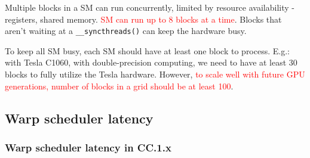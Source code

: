Multiple blocks in a SM can run concurrently, limited by resource
availability - registers, shared memory.
\textcolor{red}{SM can run up to 8 blocks at a time}.  Blocks that
aren't waiting at a \verb!__syncthreads()! can keep the hardware busy.

\begin{framed}
  To keep all SM busy, each SM should have at least one block to
  process. E.g.: with Tesla C1060, with double-precision computing, we
  need to have at least 30 blocks to fully utilize the Tesla
  hardware. However,
  \textcolor{red}{to scale well with future GPU generations, number of
    blocks in a grid should be at least 100}.
\end{framed}



\subsection{Warp scheduler latency}
\label{sec:warp-sched-latency-1}

\subsubsection{Warp scheduler latency in CC.1.x}
\label{sec:warp-sched-latency}

